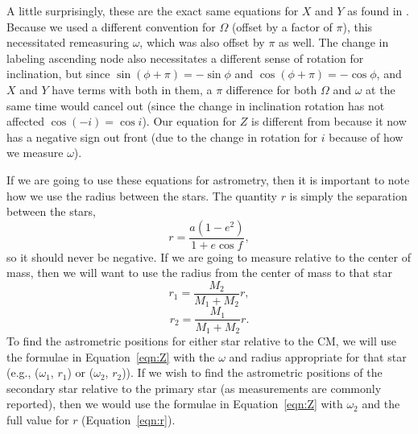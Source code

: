 \documentclass[modern]{aastex61}
\begin{document}
A little surprisingly, these are the exact same equations for $X$ and $Y$ as found in \citet{murray10}. Because we used a different convention for $\Omega$ (offset by a factor of $\pi$), this necessitated remeasuring $\omega$, which was also offset by $\pi$ as well. The change in labeling ascending node also necessitates a different sense of rotation for inclination, but since $\sin (\phi + \pi) = - \sin \phi$ and $\cos (\phi + \pi) = -\cos \phi$, and $X$ and $Y$ have terms with both in them, a $\pi$ difference for both $\Omega$ and $\omega$ at the same time would cancel out (since the change in inclination rotation has not affected $\cos(-i) = \cos i$).
Our equation for $Z$ is different from \citet{murray10} because it now has a negative sign out front (due to the change in rotation for $i$ because of how we measure $\omega$).

If we are going to use these equations for astrometry, then it is important to note how we use the radius between the stars. The quantity $r$ is simply the separation between the stars,
\begin{equation}
  r = \frac{a (1 - e^2)}{1 + e \cos f},
  \label{eqn:r}
\end{equation}
so it should never be negative.
If we are going to measure relative to the center of mass, then we will want to use the radius from the center of mass to that star
\begin{equation}
  r_1 = \frac{M_2}{M_1 + M_2} r,
\end{equation}
\begin{equation}
  r_2 = \frac{M_1}{M_1 + M_2} r.
  \label{eqn:r2}
\end{equation}
To find the astrometric positions for either star relative to the CM, we will use the formulae in Equation~\ref{eqn:Z} with the $\omega$ and radius appropriate for that star (e.g., ($\omega_1$, $r_1$) or ($\omega_2$, $r_2$)). If we wish to find the astrometric positions of the secondary star relative to the primary star (as measurements are commonly reported), then we would use the formulae in Equation~\ref{eqn:Z} with $\omega_2$ and the full value for $r$ (Equation~\ref{eqn:r}).
\end{document}
